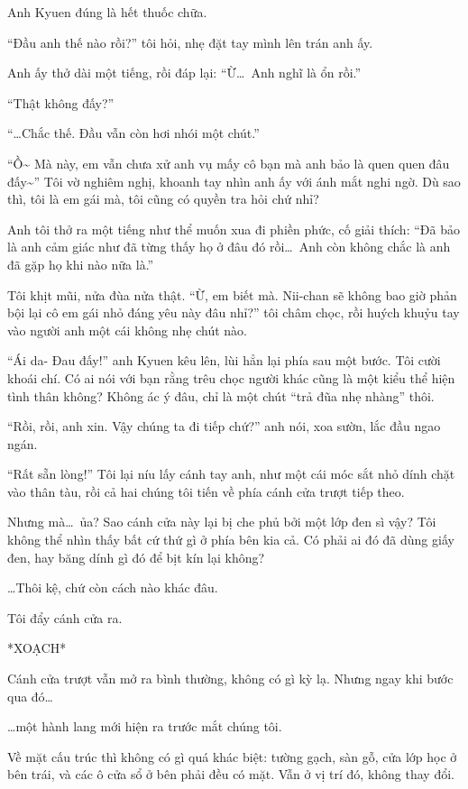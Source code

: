 \documentclass[../main.tex]{subfiles}
\begin{document}
Anh Kyuen đúng là hết thuốc chữa.

``Đầu anh thế nào rồi?'' tôi hỏi, nhẹ đặt tay mình lên trán anh ấy.

Anh ấy thở dài một tiếng, rồi đáp lại: ``Ừ\dots\ Anh nghĩ là ổn rồi.''

``Thật không đấy?''

``\dots Chắc thế. Đầu vẫn còn hơi nhói một chút.''

``Ồ\~{} Mà này, em vẫn chưa xử anh vụ mấy cô bạn mà anh bảo là quen quen đâu đấy\~{}'' Tôi vờ nghiêm nghị, khoanh tay nhìn anh ấy với ánh mắt nghi ngờ. Dù sao thì, tôi là em gái mà, tôi cũng có quyền tra hỏi chứ nhỉ?

Anh tôi thở ra một tiếng như thể muốn xua đi phiền phức, cố giải thích: ``Đã bảo là anh cảm giác như đã từng thấy họ ở đâu đó rồi\dots\ Anh còn không chắc là anh đã gặp họ khi nào nữa là.''

Tôi khịt mũi, nửa đùa nửa thật. ``Ừ, em biết mà. Nii-chan sẽ không bao giờ phản bội lại cô em gái nhỏ đáng yêu này đâu nhỉ?'' tôi châm chọc, rồi huých khuỷu tay vào người anh một cái không nhẹ chút nào.

``Ái da- Đau đấy!'' anh Kyuen kêu lên, lùi hẳn lại phía sau một bước. Tôi cười khoái chí. Có ai nói với bạn rằng trêu chọc người khác cũng là một kiểu thể hiện tình thân không? Không ác ý đâu, chỉ là một chút ``trả đũa nhẹ nhàng'' thôi.

``Rồi, rồi, anh xin. Vậy chúng ta đi tiếp chứ?'' anh nói, xoa sườn, lắc đầu ngao ngán.

``Rất sẵn lòng!'' Tôi lại níu lấy cánh tay anh, như một cái móc sắt nhỏ dính chặt vào thân tàu, rồi cả hai chúng tôi tiến về phía cánh cửa trượt tiếp theo.

Nhưng mà\dots\ ủa? Sao cánh cửa này lại bị che phủ bởi một lớp đen sì vậy? Tôi không thể nhìn thấy bất cứ thứ gì ở phía bên kia cả. Có phải ai đó đã dùng giấy đen, hay băng dính gì đó để bịt kín lại không?

\dots Thôi kệ, chứ còn cách nào khác đâu.

Tôi đẩy cánh cửa ra.

*XOẠCH*

Cánh cửa trượt vẫn mở ra bình thường, không có gì kỳ lạ. Nhưng ngay khi bước qua đó\dots

\dots một hành lang mới hiện ra trước mắt chúng tôi.


Về mặt cấu trúc thì không có gì quá khác biệt: tường gạch, sàn gỗ, cửa lớp học ở bên trái, và các ô cửa sổ ở bên phải đều có mặt. Vẫn ở vị trí đó, không thay đổi.
\end{document}
